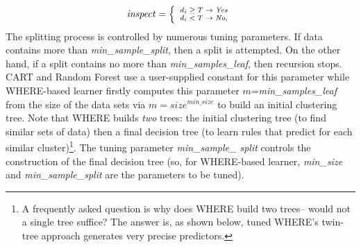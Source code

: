 \documentclass{sig-alternative}
\begin{document}
\begin{equation}\label{eq:yesno}\scriptsize
\mathit{inspect}= \left\{
\begin{array}{ll}
d_i \ge T \rightarrow \mathit{Yes}\\
d_i <   T \rightarrow \mathit{No} ,
\end{array}\right.
\end{equation}
The splitting process is controlled by numerous tuning parameters.
If data contains more than {\em min\_sample\_split}, then a split is attempted.
On the other hand, if a split contains no more than {\em min\_samples\_leaf}, then recursion stops. CART and Random Forest use a 
user-supplied constant for this parameter while
WHERE-based learner firstly computes this parameter $m$={\em min\_samples\_leaf} from the size of the data
sets via  $m=\mathit{size}^\mathit{min\_size}$ to build an initial  clustering tree.
Note that WHERE builds {\em two} trees: the initial clustering tree (to find similar sets of data)
then a final decision tree (to learn rules that predict for each similar cluster)\footnote{A
frequently asked question is why does WHERE build two trees--
would not   a single tree suffice? The answer is, as shown below,  tuned WHERE's twin-tree approach 
generates very precise predictors.}.
The tuning parameter  {\em min\_sample\_ split } controls the construction of the
final decision tree (so, for WHERE-based learner,
{\em min\_size} and {\em min\_sample\_split} are the parameters to be tuned).
\end{document}
